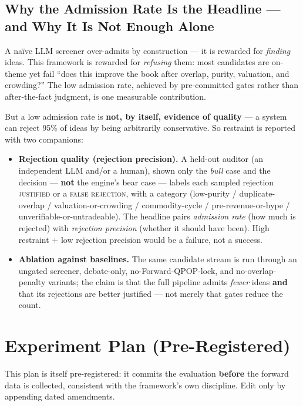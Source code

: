\documentclass[11pt]{article}
\begin{document}
\subsection*{Why the Admission Rate Is the Headline --- and Why It Is Not Enough Alone}

A na\"{i}ve LLM screener over-admits by construction --- it is rewarded for \emph{finding} ideas.
This framework is rewarded for \emph{refusing} them: most candidates are on-theme yet fail ``does
this improve the book after overlap, purity, valuation, and crowding?'' The low admission rate,
achieved by pre-committed gates rather than after-the-fact judgment, is one measurable contribution.

But a low admission rate is \textbf{not, by itself, evidence of quality} --- a system can reject
95\% of ideas by being arbitrarily conservative. So restraint is reported with two companions:

\begin{itemize}
  \item \textbf{Rejection quality (rejection precision).} A held-out auditor (an independent LLM
    and/or a human), shown only the \emph{bull} case and the decision --- \textbf{not} the engine's
    bear case --- labels each sampled rejection \textsc{justified} or a \textsc{false rejection},
    with a category (low-purity / duplicate-overlap / valuation-or-crowding / commodity-cycle /
    pre-revenue-or-hype / unverifiable-or-untradeable). The headline pairs \emph{admission rate}
    (how much is rejected) with \emph{rejection precision} (whether it should have been). High
    restraint + low rejection precision would be a failure, not a success.

  \item \textbf{Ablation against baselines.} The same candidate stream is run through an ungated
    screener, debate-only, no-Forward-QPOP-lock, and no-overlap-penalty variants; the claim is that
    the full pipeline admits \emph{fewer} ideas \textbf{and} that its rejections are better
    justified --- not merely that gates reduce the count.
\end{itemize}

\section{Experiment Plan (Pre-Registered)}
\label{sec:experiment-plan}

This plan is itself pre-registered: it commits the evaluation \textbf{before} the forward data is
collected, consistent with the framework's own discipline.
Edit only by appending dated amendments.
\end{document}
